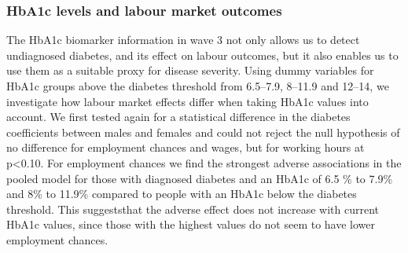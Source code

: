 \subsubsection{HbA1c levels and labour market outcomes}

The \ac{HbA1c} biomarker information in wave 3 not only allows
us to detect undiagnosed diabetes, and its effect on labour outcomes,
but it also enables us to use them as a suitable proxy for disease
severity. Using dummy variables for \ac{HbA1c} groups above the
diabetes threshold from 6.5--7.9, 8--11.9 and 12--14, we investigate
how labour market effects differ when taking \ac{HbA1c} values
into account. We first tested again for a statistical difference in
the diabetes coefficients between males and females and could not
reject the null hypothesis of no difference for employment chances
and wages, but for working hours at p<0.10. For employment chances
we find the strongest adverse associations in the pooled model for
those with diagnosed diabetes and an \ac{HbA1c} of 6.5 \% to 7.9\%
and 8\% to 11.9\% compared to people with an \ac{HbA1c} below the
diabetes threshold. This suggeststhat the adverse effect does not
increase with current \ac{HbA1c} values, since those with the highest
values do not seem to have lower employment chances. 



